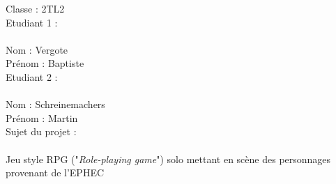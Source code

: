 \documentclass[8pt,a4paper,titlepage]{report}
\author{Baptiste Vergote & Martin Schreinemachers}
\begin{document}
\clearpage
\noindent
{\huge Classe : 2TL2}\\[3cm]
{\huge Etudiant 1 :}\\\\
Nom : Vergote\\
Prénom : Baptiste\\[3cm]
{\huge Etudiant 2 : }\\\\
Nom : Schreinemachers\\
Prénom : Martin\\[3cm]
{\huge Sujet du projet :}\\\\
Jeu style RPG ("\textit{Role-playing game}") solo mettant en scène des personnages provenant de l'EPHEC
\end{document}
